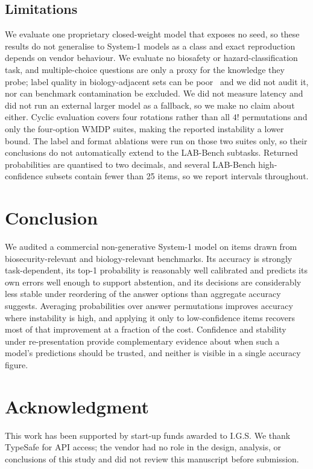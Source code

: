 \documentclass[conference,compsoc]{IEEEtran}
\begin{document}
\subsection{Limitations}

We evaluate one proprietary closed-weight model that exposes no seed, so these results
do not generalise to System-1 models as a class and exact reproduction depends on vendor
behaviour. We evaluate no biosafety or hazard-classification task, and multiple-choice
questions are only a proxy for the knowledge they probe; label quality in biology-adjacent sets can be poor~\cite{mmluredux} and we did not audit it, nor can benchmark
contamination be excluded. We did
not measure latency and did not run an external larger model as a fallback, so we make no
claim about either. Cyclic evaluation covers four rotations rather than all $4!$ permutations and only the
four-option WMDP suites, making the reported instability a lower bound. The label and
format ablations were run on those two suites only, so their conclusions do not
automatically extend to the LAB-Bench subtasks. Returned probabilities are quantised
to two decimals, and several LAB-Bench high-confidence subsets contain fewer than 25 items,
so we report intervals throughout.

\section{Conclusion}

We audited a commercial non-generative System-1 model on \statNItems{} items drawn from
biosecurity-relevant and biology-relevant benchmarks. Its accuracy is strongly
task-dependent, its top-1 probability is reasonably well calibrated and predicts its own
errors well enough to support abstention, and its decisions are considerably less stable
under reordering of the answer options than aggregate accuracy suggests. Averaging
probabilities over answer permutations improves accuracy where instability is high, and
applying it only to low-confidence items recovers most of that improvement at a fraction of
the cost. Confidence and stability under re-presentation provide complementary evidence
about when such a model's predictions should be trusted, and neither is visible in a single
accuracy figure.

\section*{Acknowledgment} This work has been supported by start-up funds awarded to
I.G.S. We thank TypeSafe for API access; the vendor had no role in the design, analysis,
or conclusions of this study and did not review this manuscript before submission.
\end{document}

